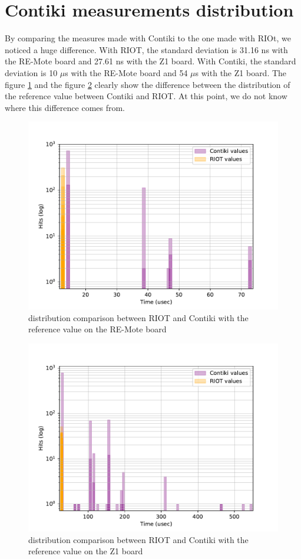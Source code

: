 \newpage
\section{Contiki measurements distribution}

By comparing the measures made with Contiki to the one made with RIOt, we noticed a huge difference.
With RIOT, the standard deviation is 31.16 ns with the RE-Mote board and 27.61 ns with the Z1 board.
With Contiki, the standard deviation is 10 $\mu$s with the RE-Mote board and 54 $\mu$s with the Z1 board.
The figure \ref{fig:deviation-ref-value-remote} and the figure \ref{fig:deviation-ref-value-z1} clearly show the difference between the distribution of the reference value between Contiki and RIOT.
At this point, we do not know where this difference comes from.

\begin{figure}[!ht]
  \centering
  \includegraphics[scale=.7]{assets/offset-remote.pdf}
  \caption{distribution comparison between RIOT and Contiki with the reference value on the RE-Mote board\label{fig:deviation-ref-value-remote}}
\end{figure}

\begin{figure}[!ht]
  \centering
  \includegraphics[scale=.7]{assets/offset-z1.pdf}
  \caption{distribution comparison between RIOT and Contiki with the reference value on the Z1 board\label{fig:deviation-ref-value-z1}}
\end{figure}